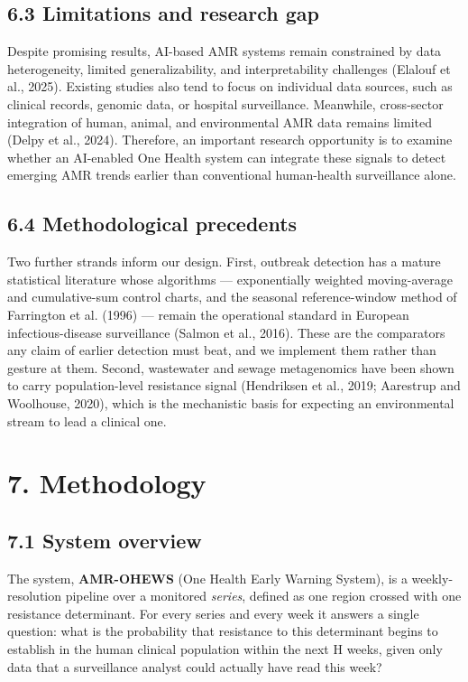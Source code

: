 \documentclass[11pt,a4paper]{article}
\begin{document}
\subsection*{6.3 Limitations and research gap}

Despite promising results, AI-based AMR systems remain constrained by data heterogeneity, limited generalizability, and interpretability challenges (Elalouf et al., 2025). Existing studies also tend to focus on individual data sources, such as clinical records, genomic data, or hospital surveillance. Meanwhile, cross-sector integration of human, animal, and environmental AMR data remains limited (Delpy et al., 2024). Therefore, an important research opportunity is to examine whether an AI-enabled One Health system can integrate these signals to detect emerging AMR trends earlier than conventional human-health surveillance alone.

\subsection*{6.4 Methodological precedents}

Two further strands inform our design. First, outbreak detection has a mature statistical literature whose algorithms — exponentially weighted moving-average and cumulative-sum control charts, and the seasonal reference-window method of Farrington et al. (1996) — remain the operational standard in European infectious-disease surveillance (Salmon et al., 2016). These are the comparators any claim of earlier detection must beat, and we implement them rather than gesture at them. Second, wastewater and sewage metagenomics have been shown to carry population-level resistance signal (Hendriksen et al., 2019; Aarestrup and Woolhouse, 2020), which is the mechanistic basis for expecting an environmental stream to lead a clinical one.

\section*{7. Methodology}

\subsection*{7.1 System overview}

The system, \textbf{AMR-OHEWS} (One Health Early Warning System), is a weekly-resolution pipeline over a monitored \emph{series}, defined as one region crossed with one resistance determinant. For every series and every week it answers a single question: what is the probability that resistance to this determinant begins to establish in the human clinical population within the next H weeks, given only data that a surveillance analyst could actually have read this week?
\end{document}
